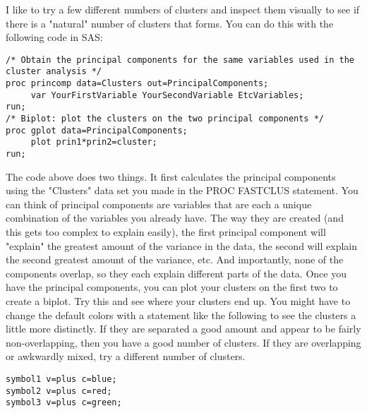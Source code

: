 \documentclass[a4paper,12pt]{article}
\begin{document}
I like to try a few different numbers of clusters and inspect them visually to see if there is a "natural" number of clusters that forms. You can do this with the following code in SAS:
\begin{framed}
	\begin{verbatim}
/* Obtain the principal components for the same variables used in the cluster analysis */
proc princomp data=Clusters out=PrincipalComponents;
     var YourFirstVariable YourSecondVariable EtcVariables;
run;
/* Biplot: plot the clusters on the two principal components */
proc gplot data=PrincipalComponents;
     plot prin1*prin2=cluster;
run;
\end{verbatim}
\end{framed}
The code above does two things. It first calculates the principal components using the "Clusters" data set you made in the PROC FASTCLUS statement. You can think of principal components are variables that are each a unique combination of the variables you already have. The way they are created (and this gets too complex to explain easily), the first principal component will "explain" the greatest amount of the variance in the data, the second will explain the second greatest amount of the variance, etc. And importantly, none of the components overlap, so they each explain different parts of the data.
Once you have the principal components, you can plot your clusters on the first two to create a biplot. Try this and see where your clusters end up. You might have to change the default colors with a statement like the following to see the clusters a little more distinctly. If they are separated a good amount and appear to be fairly non-overlapping, then you have a good number of clusters. If they are overlapping or awkwardly mixed, try a different number of clusters.
\begin{framed}
	\begin{verbatim}
symbol1 v=plus c=blue;
symbol2 v=plus c=red;
symbol3 v=plus c=green;
\end{verbatim}
\end{framed}
\end{document}
